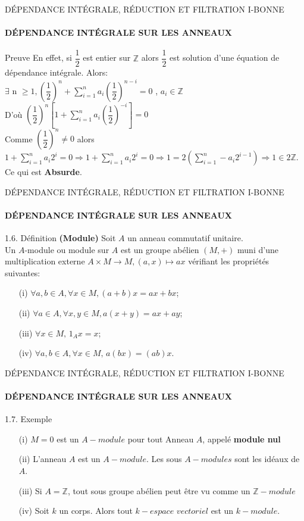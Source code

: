 \documentclass[11pt,a4paper]{beamer}
\begin{document}
\begin{frame}{DÉPENDANCE INTÉGRALE, RÉDUCTION ET FILTRATION I-BONNE}
	\framesubtitle{DÉPENDANCE INTÉGRALE SUR LES ANNEAUX}
	\begin{block}{Preuve}
	En effet, si $\dfrac{1}{2}$ est entier sur $\mathbb{Z}$ alors $\dfrac{1}{2}$ est solution d'une équation de dépendance intégrale. Alors: \\
	$\exists$ n $\geq 1 , \left(\dfrac{1}{2} \right)^n + \sum_{i=1}^{n} a_i \left(\dfrac{1}{2} \right)^{n-i} = 0$ , $a_i \in\mathbb{Z}$\\
	D'où $\left(\dfrac{1}{2} \right)^n \left[1+\sum_{i=1}^{n} a_i \left(\dfrac{1}{2} \right)^{-i}\right] = 0$\\
	Comme $\left(\dfrac{1}{2} \right)^n \neq 0$ alors $1+\sum_{i=1}^{n} a_i2^{i} = 0\Longrightarrow 1+\sum_{i=1}^{n} a_i2^{i} = 0 \Longrightarrow 1 = 2\left(\sum_{i=1}^{n} -a_i 2^{i-1}\right) \Longrightarrow 1\in 2\mathbb{Z}.$ Ce qui est \textbf{Absurde}. 
	\end{block}
\end{frame}

\begin{frame}{DÉPENDANCE INTÉGRALE, RÉDUCTION ET FILTRATION I-BONNE}
	\framesubtitle{DÉPENDANCE INTÉGRALE SUR LES ANNEAUX}
	\begin{block}{1.6. Définition \textbf{(Module)}}
	Soit $A$ un anneau commutatif unitaire.\\
	Un $A$-module ou module sur $A$ est un groupe abélien $(M,+)$ muni d'une multiplication externe $A \times M \rightarrow M, (a,x) \mapsto ax$ vérifiant les propriétés suivantes:
	\begin{enumerate}
		\item[(i)]$ \forall a, b \in A, \forall x \in M,(a+b)x = ax+bx$; \pause
		\item[(ii)] $ \forall a \in A, \forall x, y \in M,a(x+y) = ax+ay$; \pause
		\item[(iii)] $ \forall x \in M, \,1_A x = x$; \pause
		\item[(iv)] $\forall a, b \in A, \forall x \in M, \, a(bx)=(ab)x$.
	\end{enumerate}
	\end{block}
\end{frame}

\begin{frame}{DÉPENDANCE INTÉGRALE, RÉDUCTION ET FILTRATION I-BONNE}
	\framesubtitle{DÉPENDANCE INTÉGRALE SUR LES ANNEAUX}
	\begin{block}{1.7. Exemple}
		\begin{enumerate}
	\item[(i)] $M={0}$ est un $A-module$ pour tout Anneau $A$, appelé \textbf{module nul} \pause
	\item[(ii)] L'anneau $A$ est un $A-module$. Les sous $A-modules$ sont les idéaux de $A$. \pause
	\item[(iii)] Si $A= \mathbb{Z}$, tout sous groupe abélien peut être vu comme un $\mathbb{Z}-module$ \pause
	\item[(iv)] Soit $k$ un corps.  Alors tout $k-espace$ $vectoriel$ est un $k-module$. 
	\end{enumerate}
	\end{block}
\end{frame}
\end{document}
